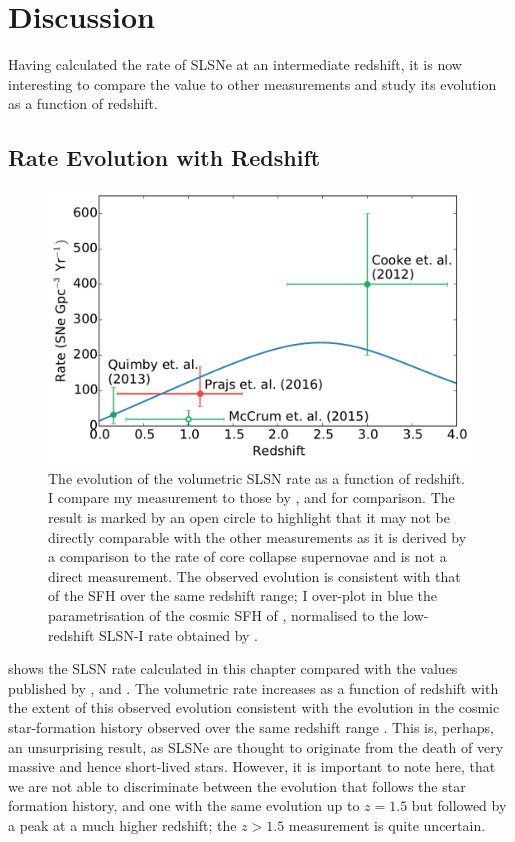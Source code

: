 \section{Discussion}
Having calculated the rate of SLSNe at an intermediate redshift, it is now interesting to compare the value to other measurements and study its evolution as a function of redshift.

\subsection{Rate Evolution with Redshift}
\label{sec:Discussion}
\begin{figure}
\includegraphics[width=\textwidth]{Figures/Chapter4/rate}
\caption{The evolution of the volumetric SLSN rate as a function of redshift. I compare my measurement to those by \citet{Cooke2012}, \citet{Quimby2014} and \citet{McCrum2014} for comparison. The \citet{McCrum2014} result is marked by an open circle to highlight that it may not be directly comparable with the other measurements as it is derived by a comparison to the rate of core collapse supernovae and is not a direct measurement. The observed evolution is consistent with that of the SFH over the same redshift range; I over-plot in blue the parametrisation of the cosmic SFH of \citet{Hopkins2006}, normalised to the low-redshift SLSN-I rate obtained by \citet{Quimby2014}.}
\label{fig:rate}
\end{figure}

 shows the SLSN rate calculated in this chapter compared with the values published by \citet{Cooke2012}, \citet{Quimby2014} and \citet{McCrum2014}. The volumetric rate increases as a function of redshift with the extent of this observed evolution consistent with the evolution in the cosmic star-formation history observed over the same redshift range \citep{Hopkins2006}. This is, perhaps, an unsurprising result, as SLSNe are thought to originate from the death of very massive and hence short-lived stars. However, it is important to note here, that we are not able to discriminate between the evolution that follows the star formation history, and one with the same evolution up to $z=1.5$ but followed by a peak at a much higher redshift; the $z>1.5$ measurement is quite uncertain.

